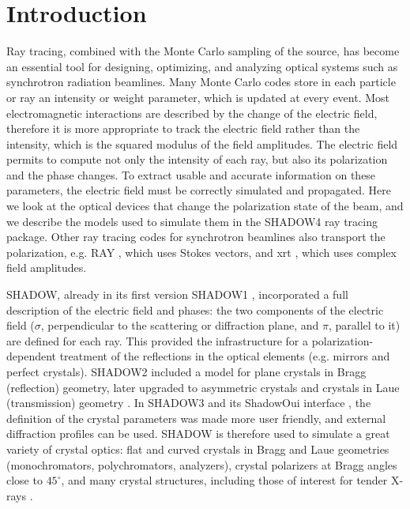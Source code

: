 \documentclass{iucr}
\begin{document}
\section{Introduction}\label{sec:introduction}

Ray tracing, combined with the Monte Carlo sampling of the source, has become an essential tool for designing, optimizing, and analyzing optical systems such as synchrotron radiation beamlines.
Many Monte Carlo codes store in each particle or ray an intensity or weight parameter, which is updated at every event.
Most electromagnetic interactions are described by the change of the electric field, therefore it is more appropriate to track the electric field rather than the intensity, which is the squared modulus of the field amplitudes.
The electric field permits to compute not only the intensity of each ray, but also its polarization and the phase changes. To extract usable and accurate information on these parameters, the electric field must be correctly simulated and propagated.
Here we look at the optical devices that change the polarization state of the beam, and we describe the models used to simulate them in the SHADOW4 \cite{ShadowSRN2023, SHADOW4} ray tracing package.
Other ray tracing codes for synchrotron beamlines also transport the polarization, e.g. RAY \cite{Schafers2008}, which uses Stokes vectors, and xrt \cite{Klementiev2014}, which uses complex field amplitudes.

SHADOW, already in its first version SHADOW1 \cite{Cerrina1984}, incorporated a full description of the electric field and phases: the two components of the electric field ($\sigma$, perpendicular to the scattering or diffraction plane, and $\pi$, parallel to it) are defined for each ray. This provided the infrastructure for a polarization-dependent treatment of the reflections in the optical elements (e.g. mirrors and perfect crystals). SHADOW2 \cite{Lai1988} included a model for plane crystals in Bragg (reflection) geometry, later upgraded to asymmetric crystals \cite{SanchezdelRio1992} and crystals in Laue (transmission) geometry \cite{SanchezdelRio1994}. In SHADOW3 \cite{codeSHADOW} and its ShadowOui interface \cite{codeSHADOWOUI}, the definition of the crystal parameters was made more user friendly, and external diffraction profiles can be used. SHADOW is therefore used to simulate a great variety of crystal optics: flat and curved crystals in Bragg and Laue geometries (monochromators, polychromators, analyzers), crystal polarizers at Bragg angles close to $45^\circ$, and many crystal structures, including those of interest for tender X-rays \cite{Yu_2022}.
\end{document}
